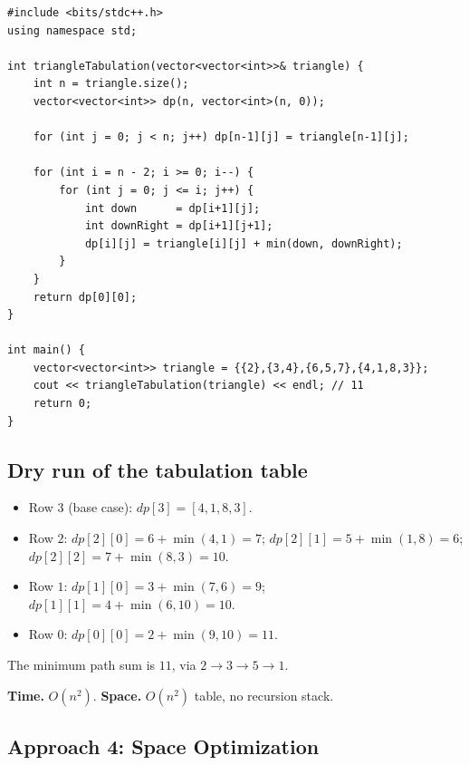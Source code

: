 \begin{lstlisting}
#include <bits/stdc++.h>
using namespace std;

int triangleTabulation(vector<vector<int>>& triangle) {
    int n = triangle.size();
    vector<vector<int>> dp(n, vector<int>(n, 0));

    for (int j = 0; j < n; j++) dp[n-1][j] = triangle[n-1][j];

    for (int i = n - 2; i >= 0; i--) {
        for (int j = 0; j <= i; j++) {
            int down      = dp[i+1][j];
            int downRight = dp[i+1][j+1];
            dp[i][j] = triangle[i][j] + min(down, downRight);
        }
    }
    return dp[0][0];
}

int main() {
    vector<vector<int>> triangle = {{2},{3,4},{6,5,7},{4,1,8,3}};
    cout << triangleTabulation(triangle) << endl; // 11
    return 0;
}
\end{lstlisting}

\subsection*{Dry run of the tabulation table}


\begin{itemize}
  \item Row $3$ (base case): $\textit{dp}[3] = [4,1,8,3]$.
  \item Row $2$: $\textit{dp}[2][0] = 6+\min(4,1)=7$;
        $\textit{dp}[2][1] = 5+\min(1,8)=6$; $\textit{dp}[2][2] =
        7+\min(8,3)=10$.
  \item Row $1$: $\textit{dp}[1][0] = 3+\min(7,6)=9$;
        $\textit{dp}[1][1] = 4+\min(6,10)=10$.
  \item Row $0$: $\textit{dp}[0][0] = 2+\min(9,10)=11$.
\end{itemize}

The minimum path sum is $\boxed{11}$, via $2\to3\to5\to1$.

\begin{complexitybox}
\textbf{Time.} $O(n^2)$.
\textbf{Space.} $O(n^2)$ table, no recursion stack.
\end{complexitybox}

\subsection*{Approach 4: Space Optimization}

